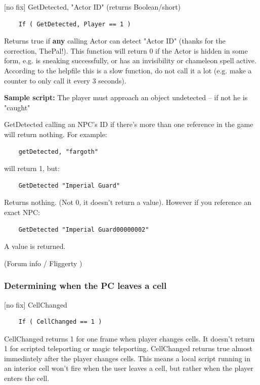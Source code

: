 {[}no fix{]} GetDetected, "Actor ID" (returns Boolean/short)

\begin{lstlisting}
	If ( GetDetected, Player == 1 )
\end{lstlisting}

Returns true if \textbf{any} calling Actor can detect "Actor ID" (thanks
for the correction, ThePal!). This function will return 0 if the Actor
is hidden in some form, e.g. is sneaking successfully, or has an
invisibility or chameleon spell active. According to the helpfile this
is a slow function, do not call it a lot (e.g. make a counter to only
call it every 3 seconds).

\textbf{Sample script:} The player must approach an object undetected --
if not he is "caught"



GetDetected calling an NPC's ID if there's more than one reference in
the game will return nothing. For example:

\begin{lstlisting}
	getDetected, "fargoth"
\end{lstlisting}

will return 1, but:

\begin{lstlisting}
	GetDetected "Imperial Guard"
\end{lstlisting}

Returns nothing. (Not 0, it doesn't return a value). However if you
reference an exact NPC:

\begin{lstlisting}
	GetDetected "Imperial Guard00000002"
\end{lstlisting}

A value is returned.

(Forum info / Fliggerty )

\hypertarget{determining-when-the-pc-leaves-a-cell}{%
\subsubsection{Determining when the PC leaves a
cell}\label{determining-when-the-pc-leaves-a-cell}}

{[}no fix{]} CellChanged

\begin{lstlisting}
	If ( CellChanged == 1 )
\end{lstlisting}

CellChanged returns 1 for one frame when player changes cells. It
doesn't return 1 for scripted teleporting or magic teleporting.
CellChanged returns true almost immediately after the player changes
cells. This means a local script running in an interior cell won't fire
when the user leaves a cell, but rather when the player enters the cell.

